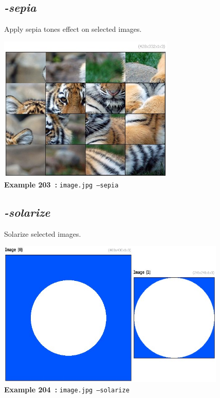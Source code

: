 \documentclass[a4paper,11pt,twoside]{book}
\begin{document}
\subsection{\emph{-sepia} }\vspace*{-0.5em}
Apply sepia tones effect on selected images.
\begin{center}\includegraphics[keepaspectratio=true,height=7cm,width=\textwidth]{img/gmic_def203.jpg}\\
{\footnotesize \textbf{Example 203~:} \texttt{image.jpg --sepia}}
\end{center}

\subsection{\emph{-solarize} }\vspace*{-0.5em}
Solarize selected images.
\begin{center}\includegraphics[keepaspectratio=true,height=7cm,width=\textwidth]{img/gmic_def204.jpg}\\
{\footnotesize \textbf{Example 204~:} \texttt{image.jpg --solarize}}
\end{center}
\end{document}
